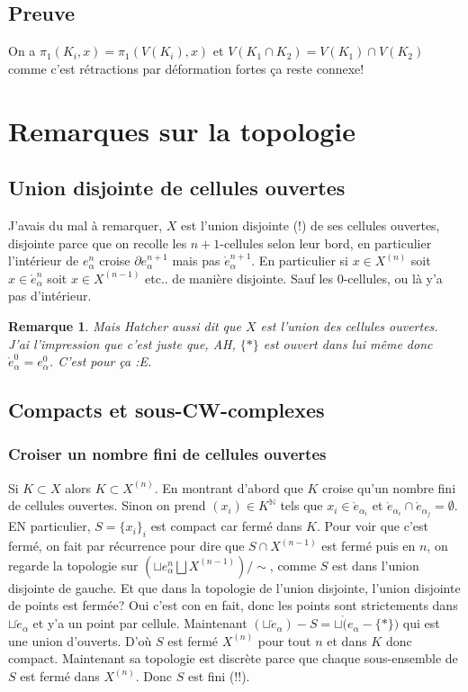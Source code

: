 \documentclass[a4paper,12pt]{book}
\newcommand{\N}{\mathbb{N}}
\theoremstyle{plain}
\newtheorem{rem}{Remarque}
\theoremstyle{definition}
\theoremstyle{remark}
\begin{document}
\subsection{Preuve}
On a $\pi_1(K_i,x)=\pi_1(V(K_i),x)$ et 
$V(K_1\cap K_2)=V(K_1)\cap V(K_2)$ comme c'est rétractions par
déformation fortes ça reste connexe!


\section{Remarques sur la topologie}
\subsection{Union disjointe de cellules ouvertes}
J'avais du mal à remarquer, $X$ est l'union disjointe (!) de ses
cellules ouvertes, disjointe parce que on recolle les 
$n+1$-cellules selon leur bord, en particulier l'intérieur de
$e_\alpha^{n}$ croise $\partial e_\alpha^{n+1}$ mais pas 
$\mathring e_\alpha^{n+1}$. En particulier si $x\in X^{(n)}$
soit $x\in \mathring e_\alpha^n$ soit $x\in X^{(n-1)}$ etc..
de manière disjointe. Sauf les $0$-cellules, ou là y'a pas
d'intérieur.

\begin{rem}
  Mais Hatcher aussi dit que $X$ est l'union des cellules ouvertes.
  J'ai l'impression que c'est juste que, AH, $\{*\}$ est ouvert
  dans lui même donc $\mathring e_\alpha^0=e_\alpha^0$. C'est
  pour ça :E.
\end{rem}


\subsection{Compacts et sous-CW-complexes}

\subsubsection{Croiser un nombre fini de cellules ouvertes}
Si $K\subset X$ alors $K\subset X^{(n)}$. En montrant d'abord que
$K$ croise qu'un nombre fini de cellules ouvertes. Sinon on prend
$(x_i)\in K^\N$ tels que $x_i\in \mathring e_{\alpha_i}$ et 
$\mathring e_{\alpha_i}\cap \mathring e_{\alpha_j}=\emptyset$. EN
particulier, $S=\{x_i\}_i$ est compact car fermé dans $K$. Pour
voir que c'est fermé, on fait par récurrence pour dire que
$S\cap X^{(n-1)}$ est fermé puis en $n$, on regarde la topologie
sur $(\sqcup e_\alpha^n \bigsqcup X^{(n-1)})/\sim$, comme $S$ 
est dans l'union disjointe de gauche. Et que dans la topologie
de l'union disjointe, l'union disjointe de points est fermée?
Oui c'est con en fait, donc les points sont strictements dans
$\sqcup \mathring e_\alpha$ et y'a un point par cellule. Maintenant
$(\sqcup \mathring e_\alpha)-S=\sqcup \mathring (e_\alpha-\{*\})$
qui est une union d'ouverts. D'où $S$ est fermé $X^{(n)}$ pour tout
$n$ et dans $K$ donc compact. Maintenant sa topologie est discrète
parce que chaque sous-ensemble de $S$ est fermé dans $X^{(n)}$.
Donc $S$ est fini (!!).
\end{document}
